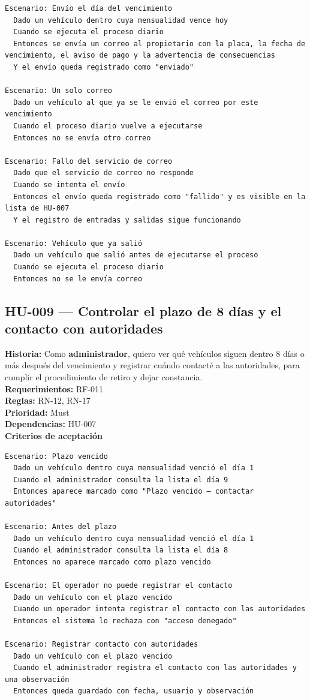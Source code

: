 \begin{lstlisting}[style=gherkin]
Escenario: Envío el día del vencimiento
  Dado un vehículo dentro cuya mensualidad vence hoy
  Cuando se ejecuta el proceso diario
  Entonces se envía un correo al propietario con la placa, la fecha de vencimiento, el aviso de pago y la advertencia de consecuencias
  Y el envío queda registrado como "enviado"

Escenario: Un solo correo
  Dado un vehículo al que ya se le envió el correo por este vencimiento
  Cuando el proceso diario vuelve a ejecutarse
  Entonces no se envía otro correo

Escenario: Fallo del servicio de correo
  Dado que el servicio de correo no responde
  Cuando se intenta el envío
  Entonces el envío queda registrado como "fallido" y es visible en la lista de HU-007
  Y el registro de entradas y salidas sigue funcionando

Escenario: Vehículo que ya salió
  Dado un vehículo que salió antes de ejecutarse el proceso
  Cuando se ejecuta el proceso diario
  Entonces no se le envía correo
\end{lstlisting}

\subsection{HU-009 — Controlar el plazo de 8 días y el contacto con autoridades}
\textbf{Historia:} Como \textbf{administrador}, quiero ver qué vehículos siguen dentro 8 días o más después del vencimiento y registrar cuándo contacté a las autoridades, para cumplir el procedimiento de retiro y dejar constancia.\\
\textbf{Requerimientos:} RF-011\\
\textbf{Reglas:} RN-12, RN-17\\
\textbf{Prioridad:} Must\\
\textbf{Dependencias:} HU-007\\
\textbf{Criterios de aceptación}

\begin{lstlisting}[style=gherkin]
Escenario: Plazo vencido
  Dado un vehículo dentro cuya mensualidad venció el día 1
  Cuando el administrador consulta la lista el día 9
  Entonces aparece marcado como "Plazo vencido – contactar autoridades"

Escenario: Antes del plazo
  Dado un vehículo dentro cuya mensualidad venció el día 1
  Cuando el administrador consulta la lista el día 8
  Entonces no aparece marcado como plazo vencido

Escenario: El operador no puede registrar el contacto
  Dado un vehículo con el plazo vencido
  Cuando un operador intenta registrar el contacto con las autoridades
  Entonces el sistema lo rechaza con "acceso denegado"

Escenario: Registrar contacto con autoridades
  Dado un vehículo con el plazo vencido
  Cuando el administrador registra el contacto con las autoridades y una observación
  Entonces queda guardado con fecha, usuario y observación
\end{lstlisting}

